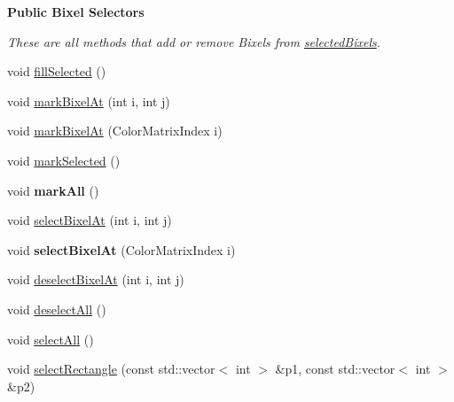 \begin{Indent}{\bf Public Bixel Selectors}\par
{\em These are all methods that add or remove Bixels from \hyperlink{classGLWidget_ab07a9ee710f42da54d0158cbdedf3674}{selected\-Bixels}. }\begin{DoxyCompactItemize}
\item 
void \hyperlink{classGLWidget_a1acd74645ffbe6bc071365c2bbd176ba}{fill\-Selected} ()
\item 
void \hyperlink{classGLWidget_aaf41952d7453b05e153821344b2421cf}{mark\-Bixel\-At} (int i, int j)
\item 
void \hyperlink{classGLWidget_a5cde6b23531556b170d5104275afcf7c}{mark\-Bixel\-At} (Color\-Matrix\-Index i)
\item 
void \hyperlink{classGLWidget_a196f90c25a7b35bd16715d74744297d3}{mark\-Selected} ()
\item 
\hypertarget{classGLWidget_a95d64c7108683e66fdc4825404ec3803}{void {\bfseries mark\-All} ()}\label{classGLWidget_a95d64c7108683e66fdc4825404ec3803}

\item 
void \hyperlink{classGLWidget_ac41fdd4181036c79f4bdf688045155b3}{select\-Bixel\-At} (int i, int j)
\item 
\hypertarget{classGLWidget_a75bca3161b8929b5190fa066cc14cc21}{void {\bfseries select\-Bixel\-At} (Color\-Matrix\-Index i)}\label{classGLWidget_a75bca3161b8929b5190fa066cc14cc21}

\item 
void \hyperlink{classGLWidget_a9ecf9af9846dacfa9cbf17cecc478145}{deselect\-Bixel\-At} (int i, int j)
\item 
void \hyperlink{classGLWidget_aa17c9adb76b61f1f0c4a285f538ce80d}{deselect\-All} ()
\item 
void \hyperlink{classGLWidget_abe918fd89a3f4c4f3d8864efee282610}{select\-All} ()
\item 
void \hyperlink{classGLWidget_a0f0089107cb0fbe89b337dfc01384e28}{select\-Rectangle} (const std\-::vector$<$ int $>$ \&p1, const std\-::vector$<$ int $>$ \&p2)
\end{DoxyCompactItemize}
\end{Indent}
